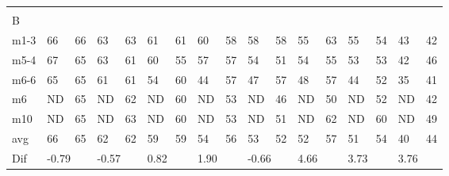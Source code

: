 \begin{table}[H]
\begin{tabular}{l|l|l|l|l|l|l|l|l|l|l|l|l|l|l|ll}
\multicolumn{17}{l}{ } \\   
B & \multicolumn{2}{l|}{} & \multicolumn{2}{l|}{} & \multicolumn{2}{l|}{} & \multicolumn{2}{l|}{} & \multicolumn{2}{l|}{} & \multicolumn{2}{l|}{}& \multicolumn{2}{l|}{}& \multicolumn{2}{l}{}     \\ \hline
m1-3   &    66    &    66   &   63    &   63    &    61   &   61     &   60     &   58       &    58   &    58     &    55   &     63      &      55   &    54   & \multicolumn{1}{l|}{43} &42  \\
m5-4   &    67    &    65   &   63    &  61     &    60     &  55    &   57     &    57     &  54     &     51     &   54   &     55       &     53    &    53   & \multicolumn{1}{l|}{42} &46  \\
m6-6   &   65      &   65      &   61   &  61   &   54    &   60     &    44    &    57      &   47   &     57     &     48    &    57     &     44     &   52  & \multicolumn{1}{l|}{35} &41  \\
m6   &   ND     &      65   &    ND  &     62  &    ND    &   60   &   ND   &    53      &   ND  &      46    &   ND    &      50    &     ND   &     52  & \multicolumn{1}{l|}{ND} & 42 \\
m10  &   ND   &    65   &    ND   &     63    &    ND    &   60   &   ND   &    53      &   ND   &     51    &     ND  &     62     &     ND   &     60  & \multicolumn{1}{l|}{ND} &49  \\ \hline
avg  &     66    &     65    &    62     &     62       &     59    &   59         &     54   &   56         &     53     &  52         &     52       &    57        &       51        &   54       & \multicolumn{1}{l|}{40} & 44\\ \hline
Dif & \multicolumn{2}{l|}{-0.79} & \multicolumn{2}{l|}{-0.57} & \multicolumn{2}{l|}{0.82} & \multicolumn{2}{l|}{1.90} & \multicolumn{2}{l|}{-0.66} & \multicolumn{2}{l|}{4.66}& \multicolumn{2}{l|}{3.73}& \multicolumn{2}{l}{3.76}       
\end{tabular}
\end{table}


